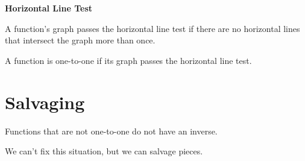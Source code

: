 \documentclass{ximera}
\begin{document}
\begin{example}
\begin{image}
\end{image}






\end{example}




\begin{definition} \textbf{\textcolor{green!50!black}{Horizontal Line Test}}  


A function's graph passes the horizontal line test if there are no horizontal lines that intersect the graph more than once.


A function is one-to-one if its graph passes the horizontal line test.

\end{definition}
















\section*{Salvaging}


Functions that are not one-to-one do not have an inverse.

We can't fix this situation, but we can salvage pieces. 
\end{document}
